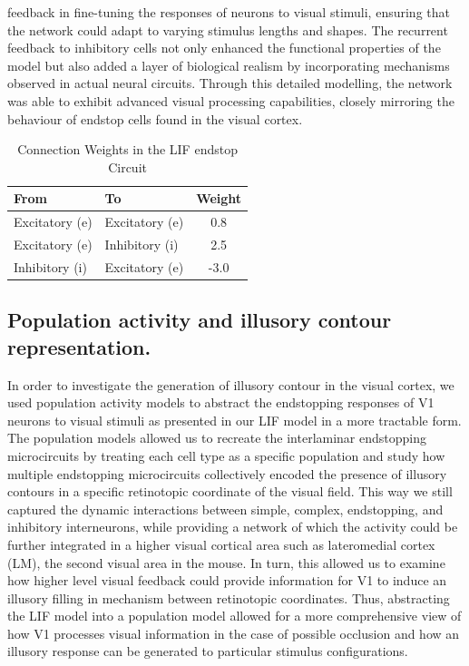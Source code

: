 \documentclass[12pt]{article}
\begin{document}
feedback in fine-tuning the responses of neurons to visual stimuli, ensuring that the network could adapt to varying stimulus lengths and shapes. The recurrent feedback to inhibitory cells not only enhanced the functional properties of the model but also added a layer of biological realism by incorporating mechanisms observed in actual neural circuits. Through this detailed modelling, the network was able to exhibit advanced visual processing capabilities, closely mirroring the behaviour of endstop cells found in the visual cortex.

\begin{table}[h]
  \centering
  \caption{Connection Weights in the LIF endstop Circuit}
  \begin{tabular}{@{}llc@{}}
      \toprule
      \textbf{From} & \textbf{To} & \textbf{Weight} \\ \midrule
      Excitatory (e) & Excitatory (e) & 0.8 \\
      Excitatory (e) & Inhibitory (i) & 2.5 \\
      Inhibitory (i) & Excitatory (e) & -3.0 \\ \bottomrule
  \end{tabular}
\end{table}

\subsection{Population activity and illusory contour representation.}
In order to investigate the generation of illusory contour in the visual cortex, we used population activity models to abstract the endstopping responses of V1 neurons to visual stimuli as presented in our LIF model in a more tractable form. The population models allowed us to recreate the interlaminar endstopping microcircuits by treating each cell type as a specific population and study how multiple endstopping microcircuits collectively encoded the presence of illusory contours in a specific retinotopic coordinate of the visual field. This way we still captured the dynamic interactions between simple, complex, endstopping, and inhibitory interneurons, while providing a network of which the activity could be further integrated in a higher visual cortical area such as lateromedial cortex (LM), the second visual area in the mouse. In turn, this allowed us to examine how higher level visual feedback could provide information for V1 to induce an illusory filling in mechanism between retinotopic coordinates. Thus, abstracting the LIF model into a population model allowed for a more comprehensive view of how V1 processes visual information in the case of possible occlusion and how an illusory response can be generated to particular stimulus configurations.
\end{document}
